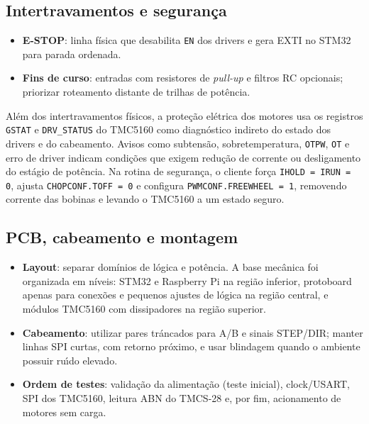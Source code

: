 \subsection{Intertravamentos e seguran\c{c}a}

\begin{itemize}
\item \textbf{E-STOP}: linha f\'isica que desabilita \texttt{EN} dos drivers e
  gera EXTI no STM32 para parada ordenada.
\item \textbf{Fins de curso}: entradas com resistores de \emph{pull-up}
  e filtros RC opcionais; priorizar roteamento distante de trilhas de
  pot\^encia.
\end{itemize}

Al\'em dos intertravamentos f\'isicos, a prote\c{c}\~ao el\'etrica dos
motores usa os registros \texttt{GSTAT} e \texttt{DRV\_STATUS} do
TMC5160 como diagn\'ostico indireto do estado dos drivers e do
cabeamento. Avisos como subtens\~ao, sobretemperatura, \texttt{OTPW},
\texttt{OT} e erro de driver indicam condi\c{c}\~oes que exigem redu\c{c}\~ao
de corrente ou desligamento do est\'agio de pot\^encia. Na rotina de
seguran\c{c}a, o cliente for\c{c}a \texttt{IHOLD = IRUN = 0}, ajusta
\texttt{CHOPCONF.TOFF = 0} e configura \texttt{PWMCONF.FREEWHEEL = 1},
removendo corrente das bobinas e levando o TMC5160 a um estado seguro.

\subsection{PCB, cabeamento e montagem}

\begin{itemize}
\item \textbf{Layout}: separar dom\'inios de l\'ogica e pot\^encia. A base
  mec\^anica foi organizada em n\'iveis: STM32 e Raspberry Pi na regi\~ao
  inferior, protoboard apenas para conex\~oes e pequenos ajustes de
  l\'ogica na regi\~ao central, e m\'odulos TMC5160 com dissipadores na
  regi\~ao superior.
\item \textbf{Cabeamento}: utilizar pares tr\'ancados para A/B e sinais STEP/DIR;
  manter linhas SPI curtas, com retorno pr\'oximo, e usar blindagem quando
  o ambiente possuir ru\'{\i}do elevado.
\item \textbf{Ordem de testes}: valida\c{c}\~ao da alimenta\c{c}\~ao (teste inicial),
  clock/USART, SPI dos TMC5160, leitura ABN do TMCS-28 e, por fim,
  acionamento de motores sem carga.
\end{itemize}

